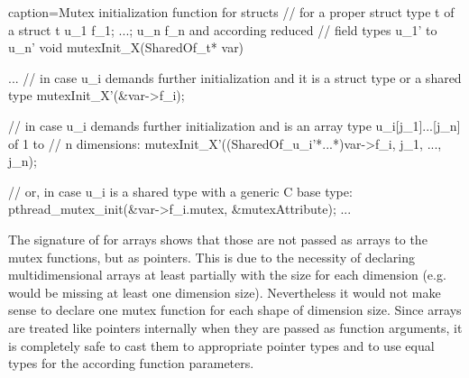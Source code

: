 \begin{ccode}{caption=Mutex initialization function for structs}
// for a proper struct type t of a struct t { u_1 f_1; ...; u_n f_n } and according reduced 
// field types u_1' to u_n'
void mutexInit_X(SharedOf_t* var) {
  ...
  // in case u_i demands further initialization and it is a struct type or a shared type
  mutexInit_X'(&var->f_i);
  
  // in case u_i demands further initialization and is an array type u_i[j_1]...[j_n] of 1 to
  // n dimensions:
  mutexInit_X'((SharedOf_u_i'*...*)var->f_i, j_1, ..., j_n);
  
  // or, in case u_i is a shared type with a generic C base type:
  pthread_mutex_init(&var->f_i.mutex, &mutexAttribute);
  ...
}
\end{ccode}
The signature of  for arrays shows that those are not passed as arrays to the mutex functions, but as pointers. This is due to the necessity of declaring multidimensional arrays at least partially with the size for each dimension (e.g.  would be missing at least one dimension size). Nevertheless it would not make sense to declare one mutex function for each shape of dimension size. Since arrays are treated like pointers internally when they are passed as function arguments, it is completely safe to cast them to appropriate pointer types and to use equal types for the according function parameters.


